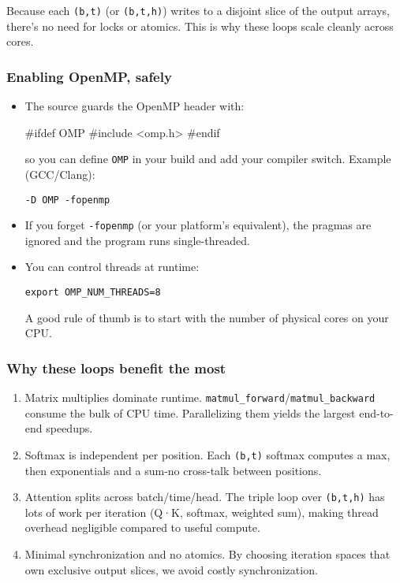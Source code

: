 \documentclass[
  letterpaper,
  DIV=11,
  numbers=noendperiod]{scrreprt}
\newenvironment{Shaded}{\begin{snugshade}}{\end{snugshade}}
\newcommand{\ImportTok}[1]{\textcolor[rgb]{0.00,0.46,0.62}{#1}}
\newcommand{\PreprocessorTok}[1]{\textcolor[rgb]{0.68,0.00,0.00}{#1}}
\begin{document}
Because each \texttt{(b,t)} (or \texttt{(b,t,h)}) writes to a disjoint
slice of the output arrays, there's no need for locks or atomics. This
is why these loops scale cleanly across cores.

\subsubsection{Enabling OpenMP, safely}\label{enabling-openmp-safely}

\begin{itemize}
\item
  The source guards the OpenMP header with:

\begin{Shaded}
\begin{Highlighting}[]
\PreprocessorTok{\#ifdef OMP}
\PreprocessorTok{\#include }\ImportTok{\textless{}omp.h\textgreater{}}
\PreprocessorTok{\#endif}
\end{Highlighting}
\end{Shaded}

  so you can define \texttt{OMP} in your build and add your compiler
  switch. Example (GCC/Clang):

\begin{verbatim}
-D OMP -fopenmp
\end{verbatim}
\item
  If you forget \texttt{-fopenmp} (or your platform's equivalent), the
  pragmas are ignored and the program runs single-threaded.
\item
  You can control threads at runtime:

\begin{verbatim}
export OMP_NUM_THREADS=8
\end{verbatim}

  A good rule of thumb is to start with the number of physical cores on
  your CPU.
\end{itemize}

\subsubsection{Why these loops benefit the
most}\label{why-these-loops-benefit-the-most}

\begin{enumerate}
\def\labelenumi{\arabic{enumi}.}
\item
  Matrix multiplies dominate runtime.
  \texttt{matmul\_forward}/\texttt{matmul\_backward} consume the bulk of
  CPU time. Parallelizing them yields the largest end-to-end speedups.
\item
  Softmax is independent per position. Each \texttt{(b,t)} softmax
  computes a max, then exponentials and a sum-no cross-talk between
  positions.
\item
  Attention splits across batch/time/head. The triple loop over
  \texttt{(b,t,h)} has lots of work per iteration (Q·K, softmax,
  weighted sum), making thread overhead negligible compared to useful
  compute.
\item
  Minimal synchronization and no atomics. By choosing iteration spaces
  that own exclusive output slices, we avoid costly synchronization.
\end{enumerate}
\end{document}

